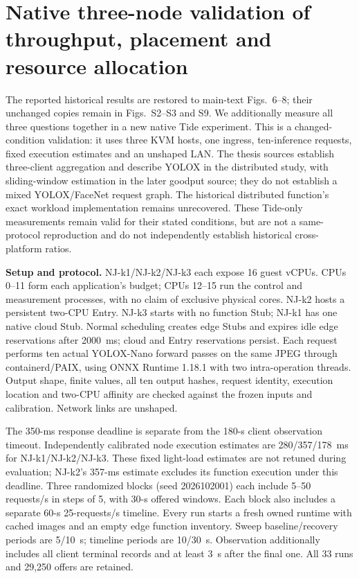 \section*{Native three-node validation of throughput, placement and resource allocation}
\label{sec:native-threefig-validation}
The reported historical results are restored to main-text Figs.~6--8; their unchanged copies remain in Figs.~S2--S3 and S9. We additionally measure all three questions together in a new native Tide experiment. This is a changed-condition validation: it uses three KVM hosts, one ingress, ten-inference requests, fixed execution estimates and an unshaped LAN. The thesis sources establish three-client aggregation and describe YOLOX in the distributed study, with sliding-window estimation in the later goodput source; they do not establish a mixed YOLOX/FaceNet request graph. The historical distributed function's exact workload implementation remains unrecovered. These Tide-only measurements remain valid for their stated conditions, but are not a same-protocol reproduction and do not independently establish historical cross-platform ratios.

\noindent\textbf{Setup and protocol.}
NJ-k1/NJ-k2/NJ-k3 each expose 16 guest vCPUs. CPUs 0--11 form each application's budget; CPUs 12--15 run the control and measurement processes, with no claim of exclusive physical cores. NJ-k2 hosts a persistent two-CPU Entry. NJ-k3 starts with no function Stub; NJ-k1 has one native cloud Stub. Normal scheduling creates edge Stubs and expires idle edge reservations after 2000~ms; cloud and Entry reservations persist. Each request performs ten actual YOLOX-Nano forward passes on the same JPEG through containerd/PAIX, using ONNX Runtime 1.18.1 with two intra-operation threads. Output shape, finite values, all ten output hashes, request identity, execution location and two-CPU affinity are checked against the frozen inputs and calibration. Network links are unshaped.

The 350-ms response deadline is separate from the 180-s client observation timeout. Independently calibrated node execution estimates are 280/357/178~ms for NJ-k1/NJ-k2/NJ-k3. These fixed light-load estimates are not retuned during evaluation; NJ-k2's 357-ms estimate excludes its function execution under this deadline. Three randomized blocks (seed 2026102001) each include 5--50 requests/s in steps of 5, with 30-s offered windows. Each block also includes a separate 60-s 25-requests/s timeline. Every run starts a fresh owned runtime with cached images and an empty edge function inventory. Sweep baseline/recovery periods are 5/10~s; timeline periods are 10/30~s. Observation additionally includes all client terminal records and at least 3~s after the final one. All 33 runs and 29,250 offers are retained.

